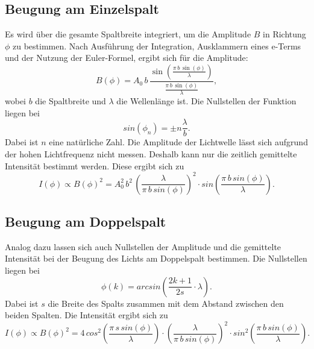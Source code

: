 \subsection{Beugung am Einzelspalt}
Es wird über die gesamte Spaltbreite integriert, um die 
Amplitude $B$ in Richtung $\phi$ zu bestimmen. Nach Ausführung 
der Integration, Ausklammern eines e-Terms und der Nutzung 
der Euler-Formel, ergibt sich für die Amplitude:
\begin{equation*}
    B(\phi) = A_0 \, b \, \frac{\sin(\frac{\pi \, b \, \sin(\phi)}{\lambda})}{\frac{\pi \, b \, \sin(\phi)}{\lambda}},
\end{equation*}
wobei $b$ die Spaltbreite und $\lambda$ 
die Wellenlänge ist. 
Die Nullstellen der Funktion liegen bei
\begin{equation} 
    sin(\phi_n)= \pm n \frac{\lambda}{b}.
    \label{eqn:nullstellen}
\end{equation}
Dabei ist $n$ eine natürliche Zahl.
Die Amplitude der Lichtwelle lässt sich aufgrund der hohen 
Lichtfrequenz nicht messen. Deshalb kann nur die zeitlich 
gemittelte Intensität bestimmt werden. 
\newline
Diese ergibt sich zu 
\begin{equation}
    I(\phi) \propto B(\phi)^2 = A^{2}_0 \, b^2 \, \left(\frac{\lambda}{\pi \, b \, sin(\phi)} \right)^2 \cdot sin \left(\frac{\pi \, b \, sin(\phi)}{\lambda}\right).
    \label{eqn:intensität}
\end{equation}

\subsection{Beugung am Doppelspalt}
Analog dazu lassen sich auch Nullstellen der Amplitude und 
die gemittelte Intensität bei der Beugung des Lichts am 
Doppelspalt bestimmen.
Die Nullstellen liegen bei 
\begin{equation}
    \phi(k) = arcsin \left(\frac{2k+1}{2s}\cdot \lambda \right).
    \label{eqn:doppelns}
\end{equation}
Dabei ist $s$ die Breite des Spalts zusammen mit
dem Abstand zwischen den beiden Spalten. 
\newline
Die Intensität ergibt sich zu 
\begin{equation}
    I(\phi) \propto B(\phi)^2 =4 \, cos^2 \left(\frac{\pi \, s \, sin(\phi)}{\lambda} \right)\cdot \left(\frac{\lambda}{\pi \, b \, sin(\phi)} \right)^2 \cdot sin^2 \left(\frac{\pi \, b \, sin(\phi)}{\lambda}\right).
    \label{eqn:doppelintensität}
\end{equation}